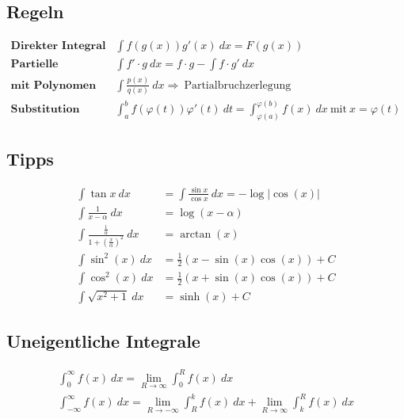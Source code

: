 \subsection{Regeln}

\begin{equation*}
\begin{split}
	\textbf{Direkter Integral}\quad & \int f(g(x))g'(x)\ dx = F(g(x)) \\
	\textbf{Partielle Integration}\quad & \int f' \cdot g\ dx = f \cdot g - \int f \cdot g'\ dx \\
	\textbf{mit Polynomen}\quad & \int\frac{p(x)}{q(x)}\ dx \Rightarrow\ \text{Partialbruchzerlegung} \\
	\textbf{Substitution}\quad & \int_a^b f(\varphi(t))\varphi'(t)\ dt = \int_{\varphi(a)}^{\varphi(b)} f(x)\ dx\ \text{mit}\ x = \varphi(t)
\end{split}
\end{equation*}

\subsection{Tipps}

\begin{equation*}
\begin{split}
	\int\tan x\ dx & = \int\frac{\sin x}{\cos x}\ dx = -\log|\cos(x)| \\
	\int \frac{1}{x - \alpha}\ dx & = \log(x-\alpha) \\
	\int\frac{\frac{1}{\alpha}}{1+(\frac{x}{\alpha})^2}\ dx & = \arctan(x) \\
	\int \sin^2(x)\ dx & = \frac{1}{2}(x - \sin(x)\cos(x)) + C \\
	\int \cos^2(x)\ dx & = \frac{1}{2}(x + \sin(x)\cos(x)) + C \\
	\int \sqrt{x^2+1}\ dx & = \sinh(x) + C
\end{split}
\end{equation*}

\subsection{Uneigentliche Integrale}

\begin{equation*}
\begin{split}
	\int_0^\infty f(x)\ dx = \lim_{R \to \infty} \int_0^R f(x)\ dx \\
	\int_{-\infty}^\infty f(x)\ dx = \lim_{R \to -\infty} \int_R^k f(x)\ dx + \lim_{R \to \infty} \int_k^R f(x)\ dx
\end{split}
\end{equation*}

